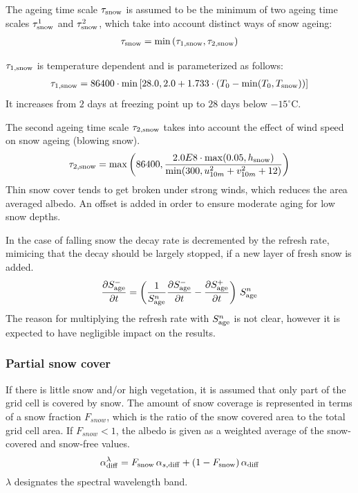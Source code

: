 \documentclass[a4paper,11pt]{article}
\begin{document}
The ageing time scale $\tau_{\rm snow}$ is assumed to be the minimum of two ageing time scales $\tau_{\rm snow}^{1}$ and $\tau_{\rm snow}^{2}$, 
which take into account distinct ways of snow ageing:
\begin{align}
 \tau_{\rm snow} = \min\left(\tau_{1,\rm snow}, \tau_{2,\rm snow}\right)
\end{align}

$\tau_{1,\rm snow}$ is temperature dependent and is parameterized as follows:
\begin{align}
 \tau_{1,\rm snow} = 86400\cdot \min\left[28.0, 2.0 + 1.733\cdot(T_{0}-\min(T_{0},T_{\rm snow}))\right]
\end{align}
It increases from $2$ days at freezing point up to $28$ days below $-15^{\circ}\mathrm{C}$.

The second ageing time scale $\tau_{2, \rm snow}$ takes into account the effect of wind speed on snow ageing (blowing snow).
\begin{align}
 \tau_{2,\rm snow} = \max\left(86400,\frac{2.0E8\cdot \max(0.05,h_{\rm snow})}{\min(300, u_{10m}^{2} + v_{10m}^{2} + 12 )}\right)
\end{align}
Thin snow cover tends to get broken under strong winds, which reduces the area averaged albedo. An offset is added in order 
to ensure moderate aging for low snow depths.

In the case of falling snow the decay rate is decremented by the refresh rate, mimicing that the decay should be 
largely stopped, if a new layer of fresh snow is added.
\begin{align}
   \frac{\partial S_{\rm age}^{-}}{\partial t} = \left(\frac{1}{S_{\rm age}^{n}}\frac{\partial S_{\rm age}^{-}}{\partial t}-\frac{\partial S_{\rm age}^{+}}{\partial t}\right)\, S_{\rm age}^{n}
\end{align}
The reason for multiplying the refresh rate with $S_{\rm age}^{n}$ is not clear, however it is expected to have negligible impact on the results.




\subsubsection{Partial snow cover}

If there is little snow and/or high vegetation, it is assumed that only part of the grid cell is covered by snow. The amount of snow coverage is 
represented in terms of a snow fraction $F_{snow}$, which is the ratio of the snow covered area to the total grid cell area. If $F_{snow}<1$, 
the albedo is given as a weighted average of the snow-covered and snow-free values.
\begin{align}
 \alpha_{\mathrm{diff}}^{\lambda} = F_{\rm snow}\,\alpha_{s,\rm diff} + (1-F_{\rm snow})\,\alpha_{\rm diff}\label{eq:albedo_partial_snow}
\end{align}
$\lambda$ designates the spectral wavelength band.
\end{document}
